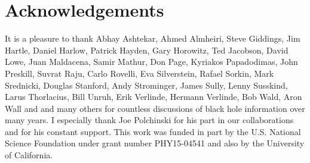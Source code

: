 \documentclass[12pt]{article}
\begin{document}
\section*{Acknowledgements}
It is a pleasure to thank Abhay Ashtekar, Ahmed Almheiri, Steve Giddings, Jim Hartle, Daniel Harlow, Patrick Hayden, Gary Horowitz, Ted Jacobson, David Lowe, Juan Maldacena, Samir Mathur, Don Page,  Kyriakos Papadodimas, John Preskill,  Suvrat Raju, Carlo Rovelli, Eva Silverstein, Rafael Sorkin, Mark Srednicki, Douglas Stanford, Andy Strominger, James Sully, Lenny Susskind, Larus Thorlacius, Bill Unruh, Erik Verlinde, Hermann Verlinde, Bob Wald, Aron Wall and and many others for countless discussions of black hole information over many years. I especially thank Joe Polchinski for his part in our collaborations and for his constant support.  This work was funded in part by the U.S. National Science Foundation under grant number PHY15-04541 and also by the University of California.
\end{document}

